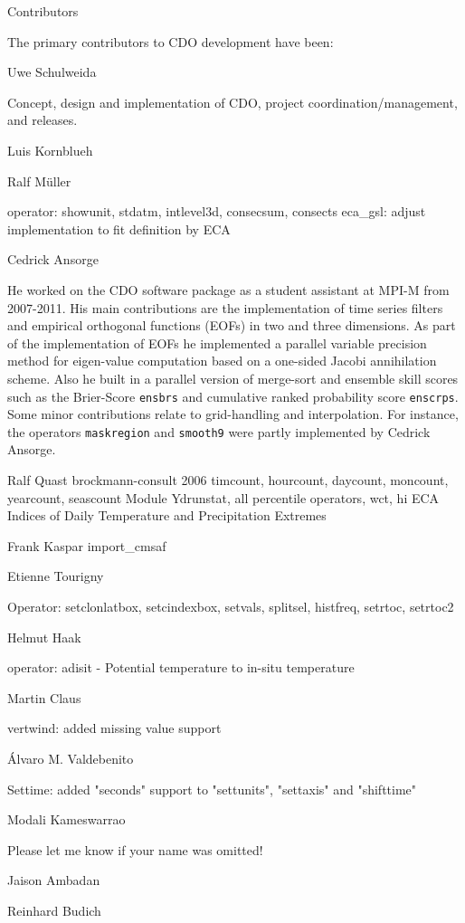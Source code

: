 Contributors

The primary contributors to CDO development have been: 

Uwe Schulweida

Concept, design and implementation of CDO, project coordination/management, and releases.

Luis Kornblueh

Ralf Müller

operator: showunit, stdatm, intlevel3d, consecsum, consects
eca_gsl: adjust implementation to fit definition by ECA

Cedrick Ansorge

He worked on the CDO software package as a student assistant at MPI-M from 2007-2011.
His main contributions are the implementation of {time series filters} and {empirical orthogonal functions (EOFs)} in two and three dimensions. 
As part of the implementation of EOFs he implemented a parallel variable precision method for eigen-value computation based on a one-sided 
Jacobi annihilation scheme. 
Also he built in a parallel version of merge-sort and ensemble skill scores such as the {Brier-Score} \texttt{ensbrs} and
{cumulative ranked probability score} \texttt{enscrps}.
Some minor contributions relate to grid-handling and interpolation. For instance, the operators \texttt{maskregion} and \texttt{smooth9} 
were partly implemented by Cedrick Ansorge.

Ralf Quast brockmann-consult 2006
timcount, hourcount, daycount, moncount, yearcount, seascount
Module Ydrunstat, all percentile operators, 
wct, hi
ECA Indices of Daily Temperature and Precipitation Extremes

Frank Kaspar
import_cmsaf

Etienne Tourigny

Operator: setclonlatbox, setcindexbox, setvals, splitsel, histfreq, setrtoc, setrtoc2

Helmut Haak

operator: adisit - Potential temperature to in-situ temperature

Martin Claus

vertwind: added missing value support

Álvaro M. Valdebenito

Settime: added "seconds" support to "settunits", "settaxis" and "shifttime"

Modali Kameswarrao


Please let me know if your name was omitted!


Jaison Ambadan

Reinhard Budich
